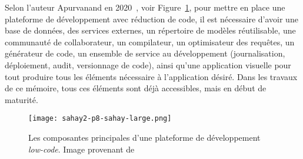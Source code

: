 Selon l'auteur Apurvanand en 2020~\cite{9226356}, voir Figure~\ref{fig:lcnc_plateform_dev}, pour mettre en place une plateforme de développement avec réduction de code, il est nécessaire d'avoir une base de données, des services externes, un répertoire de modèles réutilisable, une communauté de collaborateur, un compilateur, un optimisateur des requêtes, un générateur de code, un ensemble de service au développement (journalisation, déploiement, audit, versionnage de code), ainsi qu'une application visuelle pour tout produire tous les éléments nécessaire à l'application désiré. Dans les travaux de ce mémoire, tous ces éléments sont déjà accessibles, mais en début de maturité.

\begin{figure}[htb]
\centering
\texttt{[image: sahay2-p8-sahay-large.png]}
\caption{Les composantes principales d'une plateforme de développement \textit{low-code}. Image provenant de~\cite{9226356}}
\label{fig:lcnc_plateform_dev}
\end{figure}



